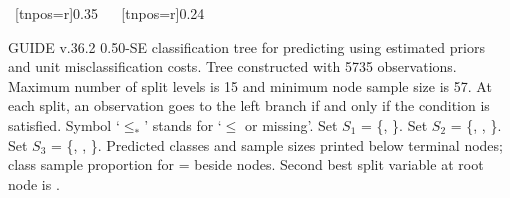 \documentclass{article}
\begin{document}
\begin{center}
{{{{ 
    ~[tnpos=r]{0.35}
    ~{}
   }
   }
    ~[tnpos=r]{0.24}
    ~{}
 }
 }
 \end{center}
GUIDE v.36.2 0.50-SE
classification tree for predicting \texttt{} using
estimated priors
and unit misclassification costs.
 Tree constructed with 5735 observations.
 Maximum number of split levels is 15 and minimum node sample size is 57.
At each split, an observation goes to the left branch 
 if and only if the condition is satisfied.
 Symbol `$\leq_*$' stands for `$\leq$ or missing'.
 Set $S_{1}$ = \{\texttt{}, \texttt{}\}.
 Set $S_{2}$ = \{\texttt{}, \texttt{},
 \texttt{}\}.
 Set $S_{3}$ = \{\texttt{}, \texttt{},
 \texttt{}\}.
Predicted classes and sample sizes printed below terminal nodes;
class sample proportion for \texttt{} =
 \texttt{} beside nodes.
 Second best split variable at root node is \texttt{}.
 
\end{document}

